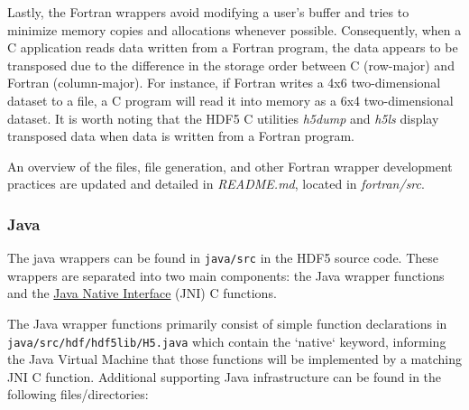 Lastly, the Fortran wrappers avoid modifying a user's buffer and tries to minimize memory copies and allocations whenever possible. Consequently, when a C application reads data written from a Fortran program, the data appears to be transposed due to the difference in the storage order between C (row-major) and Fortran (column-major). For instance, if Fortran writes a 4x6 two-dimensional dataset to a file, a C program will read it into memory as a 6x4 two-dimensional dataset. It is worth noting that the HDF5 C utilities \textit{h5dump} and \textit{h5ls} display transposed data when data is written from a Fortran program. 

An overview of the files, file generation, and other Fortran wrapper development practices are updated and detailed in \textit{README.md}, located in \textit{fortran/src}.

\subsubsection{Java\label{subsec:Java}}

The java wrappers can be found in \texttt{java/src} in the HDF5 source code. These wrappers
are separated into two main components: the Java wrapper functions and the
\href{https://docs.oracle.com/en/java/javase/17/docs/specs/jni/index.html}{Java Native Interface}
(JNI) C functions.

The Java wrapper functions primarily consist of simple function declarations in \\
\texttt{java/src/hdf/hdf5lib/H5.java} which contain the `native` keyword, informing the Java
Virtual Machine that those functions will be implemented by a matching JNI C function.
Additional supporting Java infrastructure can be found in the following files/directories:

